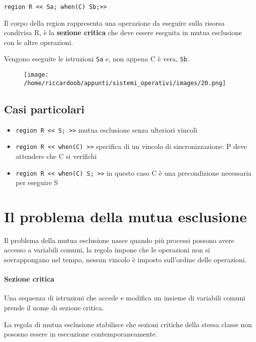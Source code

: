 \begin{verbatim}
region R << Sa; when(C) Sb;>>
\end{verbatim}

Il corpo della region rappresenta una operazione da eseguire sulla risorsa condivisa R, è la \textbf{sezione critica} che deve essere eseguita in mutua esclusione con le altre operazioni.

Vengono eseguite le istruzioni \texttt{Sa} e, non appena C è vera, \texttt{Sb}.

\begin{figure}[H]
    \centering
    \texttt{[image: /home/riccardoob/appunti/sistemi\_operativi/images/20.png]}
\end{figure}

\subsection{Casi particolari}
\begin{itemize}
    \item \texttt{region R << S; >>} mutua esclusione senza ulteriori vincoli
    \item \texttt{region R << when(C) >>} specifica di un vincolo di sincronizzazione: P deve attendere che C si verifichi
    \item \texttt{region R << when(C) S; >>} in questo caso C è una precondizione necessaria per eseguire S
\end{itemize}

\section{Il problema della mutua esclusione}
Il problema della mutua esclusione nasce quando più processi possono avere accesso a variabili comuni, la regola impone che le operazioni non si sovrappongano nel tempo, nessun vincolo è imposto sull'ordine delle operazioni.

\paragraph{Sezione critica}
Una sequenza di istruzioni che accede e modifica un insieme di variabili comuni prende il nome di sezione critica.

La regola di mutua esclusione stabilisce che sezioni critiche della stessa classe non pososno essere in esecuzione contemporaneamente.

